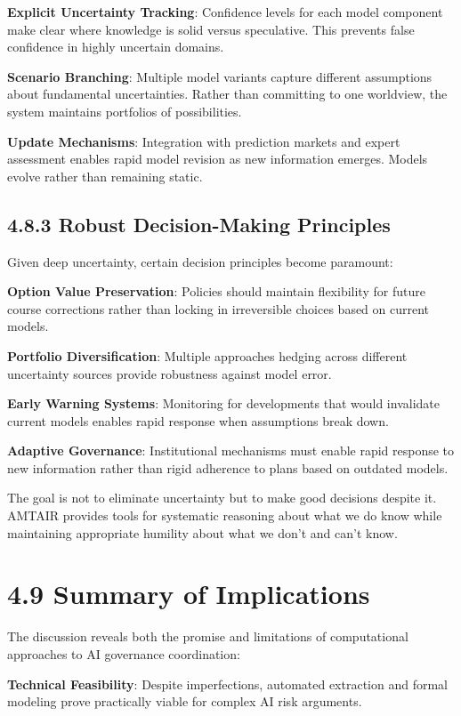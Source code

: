 \documentclass[
  11pt,
  letterpaper,
]{book}
\begin{document}
\textbf{Explicit Uncertainty Tracking}: Confidence levels for each model
component make clear where knowledge is solid versus speculative. This
prevents false confidence in highly uncertain domains.

\textbf{Scenario Branching}: Multiple model variants capture different
assumptions about fundamental uncertainties. Rather than committing to
one worldview, the system maintains portfolios of possibilities.

\textbf{Update Mechanisms}: Integration with prediction markets and
expert assessment enables rapid model revision as new information
emerges. Models evolve rather than remaining static.

\subsection{4.8.3 Robust Decision-Making
Principles}\label{sec-robust-principles}

Given deep uncertainty, certain decision principles become paramount:

\textbf{Option Value Preservation}: Policies should maintain flexibility
for future course corrections rather than locking in irreversible
choices based on current models.

\textbf{Portfolio Diversification}: Multiple approaches hedging across
different uncertainty sources provide robustness against model error.

\textbf{Early Warning Systems}: Monitoring for developments that would
invalidate current models enables rapid response when assumptions break
down.

\textbf{Adaptive Governance}: Institutional mechanisms must enable rapid
response to new information rather than rigid adherence to plans based
on outdated models.

The goal is not to eliminate uncertainty but to make good decisions
despite it. AMTAIR provides tools for systematic reasoning about what we
do know while maintaining appropriate humility about what we don't and
can't know.

\section{4.9 Summary of Implications}\label{sec-implications-summary}

The discussion reveals both the promise and limitations of computational
approaches to AI governance coordination:

\textbf{Technical Feasibility}: Despite imperfections, automated
extraction and formal modeling prove practically viable for complex AI
risk arguments.
\end{document}
